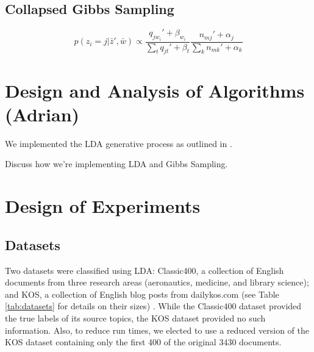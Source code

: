 \documentclass[10pt]{article}
\begin{document}
\subsection{Collapsed Gibbs Sampling}
\label{sec:gibbs}

\begin{equation}
    p(z_i = j | \bar{z}', \bar{w}) \propto \frac{q_{j w_i}' + \beta_{w_i}}{\sum_t q_{jt}' + \beta_t} \frac{n_{mj}' + \alpha_j}{\sum_k n_{mk}' + \alpha_k}
\end{equation}



\section{Design and Analysis of Algorithms (Adrian)}
\label{sec:algorithms}

We implemented the LDA generative process as outlined in \cite{CSE250B}.

Discuss how we're implementing LDA and Gibbs Sampling.



\section{Design of Experiments}
\label{sec:experiments}

%
%
\subsection{Datasets}
Two datasets were classified using LDA: Classic400, a collection of English documents from three research areas (aeronautics, medicine, and library science); and KOS, a collection of English blog posts from dailykos.com (see Table \ref{tab:datasets} for details on their sizes) \cite{Classic400, KOS_dataset}. While the Classic400 dataset provided the true labels of its source topics, the KOS dataset provided no such information. Also, to reduce run times, we elected to use a reduced version of the KOS dataset containing only the first 400 of the original 3430 documents.
\end{document}
